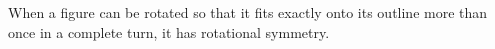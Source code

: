 When a figure can be rotated so that it fits exactly onto its outline more than once in 
a complete turn,  it has rotational symmetry.